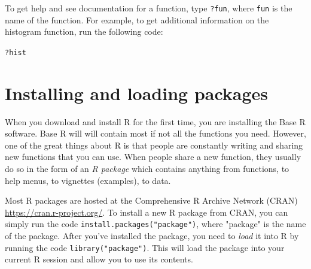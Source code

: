 \documentclass{tufte-book}\usepackage[]{graphicx}\usepackage[]{color}
\makeatletter
\newcommand{\hlopt}[1]{\textcolor[rgb]{0,0,0}{#1}}%
\newcommand{\hlstd}[1]{\textcolor[rgb]{0.345,0.345,0.345}{#1}}%
\newenvironment{kframe}{%
 \def\at@end@of@kframe{}%
 \ifinner\ifhmode%
  \def\at@end@of@kframe{\end{minipage}}%
  \begin{minipage}{\columnwidth}%
 \fi\fi%
 \def\FrameCommand##1{\hskip\@totalleftmargin \hskip-\fboxsep
 \colorbox{shadecolor}{##1}\hskip-\fboxsep
     \hskip-\linewidth \hskip-\@totalleftmargin \hskip\columnwidth}%
 \MakeFramed {\advance\hsize-\width
   \@totalleftmargin\z@ \linewidth\hsize
   \@setminipage}}%
 {\par\unskip\endMakeFramed%
 \at@end@of@kframe}
\newenvironment{knitrout}{}{} %
\makeatother
\begin{document}
\begin{enumerate}
To get help and see documentation for a function, type \texttt{?fun}, where \texttt{fun} is the name of the function. For example, to get additional information on the histogram function, run the following code:


\begin{footnotesize}
\begin{knitrout}
\color{fgcolor}\begin{kframe}
\begin{alltt}
\hlopt{?}\hlstd{hist}
\end{alltt}
\end{kframe}
\end{knitrout}
\end{footnotesize}

\end{enumerate}


\section{Installing and loading packages}

When you download and install R for the first time, you are installing the Base R software. Base R will will contain most if not all the functions you need. However, one of the great things about R is that people are constantly writing and sharing new functions that you can use. When people share a new function, they usually do so in the form of an \textit{R package} which contains anything from functions, to help menus, to vignettes (examples), to data.

Most R packages are hosted at the Comprehensive R Archive Network (CRAN) \textcolor{blue}{\href{<https://cran.r-project.org/>}{https://cran.r-project.org/}}. To install a new R package from CRAN, you can simply run the code \texttt{install.packages("package")}, where "package" is the name of the package. After you've installed the package, you need to \textit{load} it into R by running the code \texttt{library("package")}. This will load the package into your current R session and allow you to use its contents.
\end{document}
